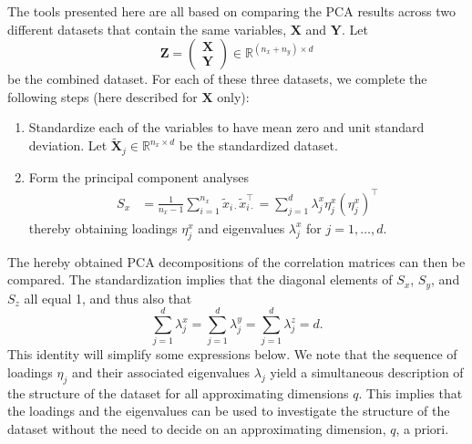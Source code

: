 \documentclass[a4paper,12pt]{article}
\newcommand{\RR}{\mathbb{R}}
\begin{document}
The tools presented here are all based on comparing the PCA results across two different datasets that contain the same variables, $\mathbf{X}$ and $\mathbf{Y}$. Let 
$$\mathbf{Z} = \begin{pmatrix} \mathbf{X} \\ \mathbf{Y} \end{pmatrix} \in \RR^{(n_x + n_y) \times d}$$
 be the combined dataset. For each of these three datasets, we complete the following steps (here described for $\mathbf{X}$ only):
\begin{enumerate}
\item Standardize each of the variables to have mean zero and unit standard deviation. Let $\tilde{\mathbf{X}}_{j} \in \RR^{n_x \times d}$ be the standardized dataset.
\item Form the principal component analyses
\begin{align*}
S_x &= \frac{1}{n_x-1} \sum_{i=1}^{n_x} \tilde{x}_{i \cdot} \tilde{x}_{i \cdot}^\top = \sum_{j=1}^d \lambda_{j}^x \eta_{j}^x ({\eta_{j}^x})^\top 
\end{align*}
thereby obtaining loadings $\eta_{j}^x$ and eigenvalues $\lambda^x_j$ for $j=1,\dotsc,d$.
\end{enumerate}
The hereby obtained PCA decompositions of the correlation matrices can then be compared. The standardization implies that the diagonal elements of $S_x$, $S_y$, and $S_z$ all equal 1, and thus also that
\begin{equation*}
\sum_{j=1}^d \lambda_j^x = \sum_{j=1}^d \lambda_{j}^y = \sum_{j=1}^d \lambda_{j}^z =  d.
\end{equation*}
This identity will simplify some expressions below. We note that the sequence of loadings $\eta_j$ and their associated eigenvalues $\lambda_j$ yield a simultaneous description of the structure of the dataset for all approximating dimensions $q$. This implies that the loadings and the eigenvalues can be used to investigate the structure of the dataset without the need to decide on an approximating dimension, $q$, a priori. 
\end{document}
